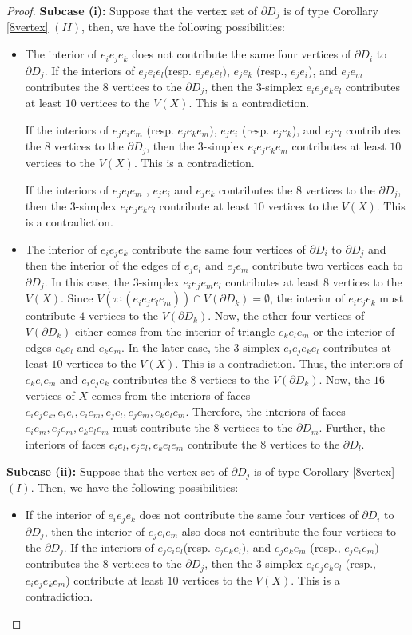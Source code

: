 \documentclass[10pt,a4paper]{amsart}
\begin{document}
\begin{proof}
\textbf{Subcase (i):} Suppose that the vertex set of $\partial D_j$ is of type Corollary \ref{8vertex} $(II)$, then, we have the following possibilities:
\begin{itemize}
\item The interior of $e_ie_je_k$  does not contribute the same four vertices of $\partial D_i$ to $\partial D_j$. If the interiors of $e_je_ie_l$(resp. $e_je_ke_l)$, $e_je_k$ (resp., $e_je_i$), and $e_je_m$ contributes the $8$ vertices to the $\partial D_j$, then the $3$-simplex $e_ie_je_ke_l$ contributes at least $10$ vertices to the $V(X)$. This is a contradiction. 

If the interiors of $e_je_ie_m$ (resp. $e_je_ke_m)$, $e_je_i$ (resp. $e_je_k$), and $e_je_l$ contributes the $8$ vertices to the $\partial D_j$, then the $3$-simplex $e_ie_je_ke_m$ contributes at least $10$ vertices to the $V(X)$. This is a contradiction.

If the interiors of $e_je_le_m$ , $e_je_i$  and $e_je_k$ contributes the $8$ vertices to the $\partial D_j$, then the $3$-simplex $e_ie_je_ke_l$ contribute at least $10$ vertices to the $V(X)$. This is a contradiction.

    \item The interior of $e_ie_je_k$ contribute the same four vertices of $\partial D_i$ to $\partial D_j$ and then the interior of the edges of $e_je_l$ and $e_je_m$ contribute two vertices each to $\partial D_j$. In this case, the $3$-simplex $e_ie_je_me_l$ contributes at least $8$ vertices to the $V(X)$. Since $V(\pi^{_1}(e_ie_je_le_m))\cap V(\partial D_k)=\emptyset$, the interior of $e_ie_je_k$ must contribute $4$ vertices to the $V(\partial D_k)$. Now, the other four vertices of $V(\partial D_k)$ either comes from the interior of triangle $e_ke_le_m$ or the interior of edges $e_ke_l$ and $e_ke_m$. In the later case, the $3$-simplex $e_ie_je_ke_l$ contributes at least $10$ vertices to the $V(X)$. This is a contradiction. Thus, the interiors of  $e_ke_le_m$ and $e_ie_je_k$ contributes the $8$ vertices to the $V(\partial D_k)$. 
    Now, the $16$ vertices of $X$ comes from the interiors of faces $e_ie_je_k, e_ie_l,e_ie_m, e_je_l,e_je_m, e_ke_le_m$. Therefore, the interiors of faces  $e_ie_m, e_je_m, e_ke_le_m$ must contribute the $8$ vertices to the $\partial D_m$. Further, the interiors of faces  $e_ie_l, e_je_l, e_ke_le_m$  contribute the $8$ vertices to the $\partial D_l$. 
\end{itemize}

\textbf{Subcase (ii):} Suppose that the vertex set of $\partial D_j$ is of type Corollary \ref{8vertex} $(I)$. Then, we have the following possibilities:
\begin{itemize}
\item  If the interior of $e_ie_je_k$  does not contribute the same four vertices of $\partial D_i$ to $\partial D_j$, then the interior of $e_je_le_m$ also does not contribute the four vertices to the $\partial D_j$. If the interiors of $e_je_ie_l$(resp. $e_je_ke_l)$, and $e_je_ke_m$ (resp., $e_je_ie_m)$ contributes the $8$ vertices to the $\partial D_j$, then the $3$-simplex $e_ie_je_ke_l$ (resp., $e_ie_je_ke_m$) contribute at least $10$ vertices to the $V(X)$. This is a contradiction. 


\end{itemize}
\end{proof}
\end{document}
